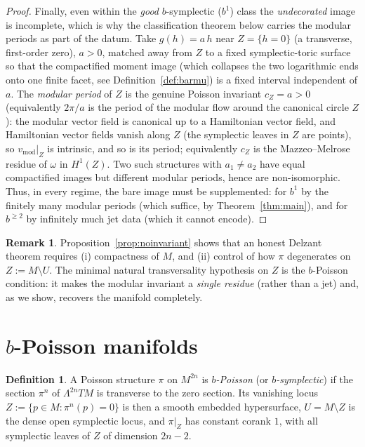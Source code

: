 \documentclass{amsart}
\theoremstyle{definition}
\newtheorem{definition}{Definition}
\newtheorem{remark}{Remark}
\begin{document}
\begin{proof}
Finally, even within the \emph{good} $b$-symplectic ($b^1$) class the
\emph{undecorated} image is incomplete, which is why the classification theorem
below carries the modular periods as part of the datum. Take $g(h)=a\,h$ near
$Z=\{h=0\}$ (a transverse, first-order zero), $a>0$, matched away from $Z$ to a
fixed symplectic-toric surface so that the compactified moment image (which
collapses the two logarithmic ends onto one finite facet, see
Definition~\ref{def:barmu}) is a fixed interval independent of $a$. The
\emph{modular period} of $Z$ is the genuine Poisson invariant
$c_Z=a>0$ (equivalently $2\pi/a$ is the period of the modular flow around the
canonical circle $Z$): the modular vector field is canonical up to a Hamiltonian
vector field, and Hamiltonian vector fields vanish along $Z$ (the symplectic
leaves in $Z$ are points), so $v_{\mathrm{mod}}|_Z$ is intrinsic, and so is its
period; equivalently $c_Z$ is the Mazzeo--Melrose residue of $\omega$ in
$H^1(Z)$. Two such structures with $a_1\neq a_2$ have equal compactified images
but different modular periods, hence are non-isomorphic. Thus, in every regime,
the bare image must be supplemented: for $b^1$ by the finitely many modular
periods (which suffice, by Theorem~\ref{thm:main}), and for $b^{\ge2}$ by
infinitely much jet data (which it cannot encode).
\end{proof}

\begin{remark}
Proposition~\ref{prop:noinvariant} shows that an honest Delzant theorem requires
(i) compactness of $M$, and (ii) control of how $\pi$ degenerates on
$Z:=M\setminus U$. The minimal natural transversality hypothesis on $Z$ is the
$b$-Poisson condition: it makes the modular invariant a \emph{single residue}
(rather than a jet) and, as we show, recovers the manifold completely.
\end{remark}

\section{$b$-Poisson manifolds}

\begin{definition}\label{def:bpoisson}
A Poisson structure $\pi$ on $M^{2n}$ is \emph{$b$-Poisson} (or
\emph{$b$-symplectic}) if the section $\pi^n$ of $\Lambda^{2n}TM$ is transverse
to the zero section. Its vanishing locus $Z:=\{p\in M:\pi^n(p)=0\}$ is then a
smooth embedded hypersurface, $U=M\setminus Z$ is the dense open symplectic
locus, and $\pi|_Z$ has constant corank $1$, with all symplectic leaves of
$Z$ of dimension $2n-2$.
\end{definition}
\end{document}
